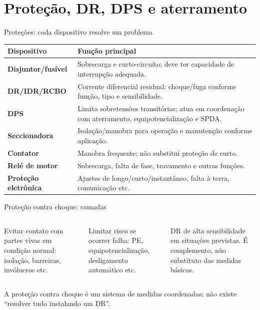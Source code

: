 \section{Proteção, DR, DPS e aterramento}

\begin{frame}{Proteções: cada dispositivo resolve um problema}
\scriptsize
\begin{tabularx}{\textwidth}{>{\bfseries}p{3.0cm}X}
\toprule
Dispositivo & Função principal \\
\midrule
Disjuntor/fusível & Sobrecarga e curto-circuito; deve ter capacidade de interrupção adequada. \\
DR/IDR/RCBO & Corrente diferencial residual: choque/fuga conforme função, tipo e sensibilidade. \\
DPS & Limita sobretensões transitórias; atua em coordenação com aterramento, equipotencialização e SPDA. \\
Seccionadora & Isolação/manobra para operação e manutenção conforme aplicação. \\
Contator & Manobra frequente; não substitui proteção de curto. \\
Relé de motor & Sobrecarga, falta de fase, travamento e outras funções. \\
Proteção eletrônica & Ajustes de longo/curto/instantâneo, falta à terra, comunicação etc. \\
\bottomrule
\end{tabularx}
\end{frame}

\begin{frame}{Proteção contra choque: camadas}
\small
\begin{columns}[T,onlytextwidth]
\begin{caixaDef}[title=Proteção básica]
Evitar contato com partes vivas em condição normal: isolação, barreiras, invólucros etc.
\end{caixaDef}
\begin{caixaNorma}[title=Proteção supletiva]
Limitar risco se ocorrer falha: PE, equipotencialização, desligamento automático etc.
\end{caixaNorma}
\begin{caixaAt}[title=Proteção adicional]
DR de alta sensibilidade em situações previstas. É complemento, não substituto das medidas básicas.
\end{caixaAt}
\end{columns}
\vspace{3mm}
\begin{caixaObs}
A proteção contra choque é um sistema de medidas coordenadas; não existe ``resolver tudo instalando um DR''.
\end{caixaObs}
\end{frame}

